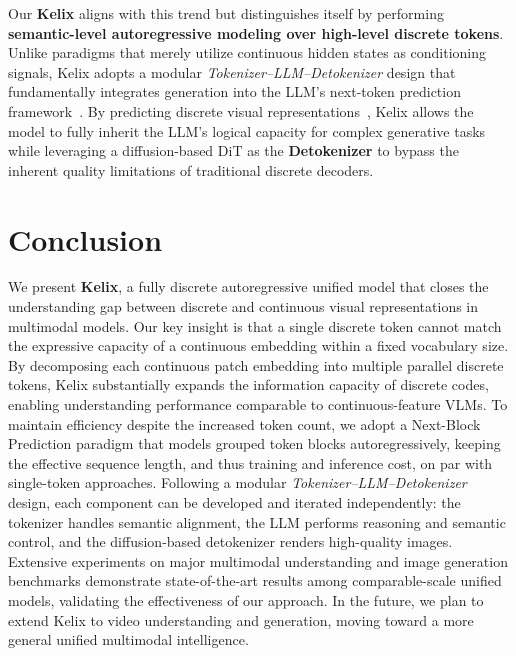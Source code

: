\documentclass[11pt, a4paper, logo, copyright]{googledeepmind}
\begin{document}
Our \textbf{Kelix} aligns with this trend but distinguishes itself by performing \textbf{semantic-level autoregressive modeling over high-level discrete tokens}. Unlike paradigms that merely utilize continuous hidden states as conditioning signals, Kelix adopts a modular \textit{Tokenizer--LLM--Detokenizer} design that fundamentally integrates generation into the LLM's next-token prediction framework~\citep{llamagen, wang2024emu3}. By predicting discrete visual representations~\citep{van2017neural}, Kelix allows the model to fully inherit the LLM’s logical capacity for complex generative tasks while leveraging a diffusion-based DiT as the \textbf{Detokenizer} to bypass the inherent quality limitations of traditional discrete decoders.

\section{Conclusion}
We present \textbf{Kelix}, a fully discrete autoregressive unified model that closes the understanding gap between discrete and continuous visual representations in multimodal models.
%
Our key insight is that a single discrete token cannot match the expressive capacity of a continuous embedding within a fixed vocabulary size. By decomposing each continuous patch embedding into multiple parallel discrete tokens, Kelix substantially expands the information capacity of discrete codes, enabling understanding performance comparable to continuous-feature VLMs.
%
To maintain efficiency despite the increased token count, we adopt a Next-Block Prediction paradigm that models grouped token blocks autoregressively, keeping the effective sequence length, and thus training and inference cost, on par with single-token approaches.
%
Following a modular \emph{Tokenizer--LLM--Detokenizer} design, each component can be developed and iterated independently: the tokenizer handles semantic alignment, the LLM performs reasoning and semantic control, and the diffusion-based detokenizer renders high-quality images.
%
Extensive experiments on major multimodal understanding and image generation benchmarks demonstrate state-of-the-art results among comparable-scale unified models, validating the effectiveness of our approach.
%
In the future, we plan to extend Kelix to video understanding and generation, moving toward a more general unified multimodal intelligence.



% 
% 

\end{document}

